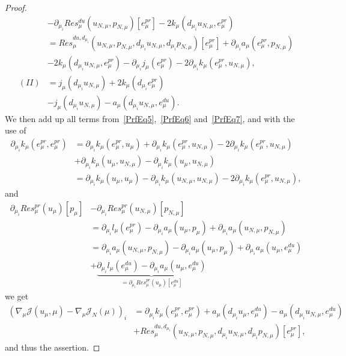 \begin{proof}
\begin{align}
        &- \partial_{\mu_i} Res_\mu^{du}(u_{N, \mu}, p_{N, \mu})[e_\mu^{pr}] - 2 k_\mu(d_{\mu_i} u_{N, \mu}, e_\mu^{pr}) \nonumber\\
        &= Res_\mu^{du, d_{\mu_i}}(u_{N, \mu}, p_{N, \mu}, d_{\mu_i} u_{N, \mu}, d_{\mu_i} p_{N, \mu})[e_\mu^{pr}] + \partial_{\mu_i} a_\mu(e_\mu^{pr}, p_{N, \mu}) \nonumber\\
        &- 2 k_\mu(d_{\mu_i} u_{N, \mu}, e_\mu^{pr}) - \partial_{\mu_i} j_\mu(e_\mu^{pr}) - 2 \partial_{\mu_i} k_\mu(e_\mu^{pr}, u_{N, \mu}), \nonumber\\
        (II) &= j_\mu(d_{\mu_i} u_{N, \mu}) + 2 k_\mu(d_{\mu_i} e_\mu^{pr}) \label{PrfEq7}\\
        &- j_\mu(d_{\mu_i} u_{N, \mu}) - a_\mu(d_{\mu_i} u_{N, \mu}, e_\mu^{du}). \nonumber
    \end{align}
    We then add up all terms from~\eqref{PrfEq5},~\eqref{PrfEq6} and~\eqref{PrfEq7}, and with the use of
    \begin{align*}
        \partial_{\mu_i} k_\mu(e_\mu^{pr}, e_\mu^{pr}) &= \partial_{\mu_i} k_\mu(e_\mu^{pr}, u_\mu) + \partial_{\mu_i} k_\mu(e_\mu^{pr}, u_{N, \mu}) - 2 \partial_{\mu_i} k_\mu(e_\mu^{pr}, u_{N, \mu}) \\
        &+ \partial_{\mu_i} k_\mu(u_\mu, u_{N, \mu}) - \partial_{\mu_i} k_\mu(u_\mu, u_{N, \mu}) \\
        &= \partial_{\mu_i} k_\mu(u_\mu, u_\mu) - \partial_{\mu_i} k_\mu(u_{N, \mu}, u_{N, \mu}) - 2 \partial_{\mu_i} k_\mu(e_\mu^{pr}, u_{N, \mu}),
    \end{align*}
    and
    \begin{align*}
        \partial_{\mu_i} Res_\mu^{pr}(u_\mu)[p_\mu] &- \partial_{\mu_i} Res_\mu^{pr}(u_{N, \mu})[p_{N, \mu}] \\
        &= \partial_{\mu_i} l_\mu(e_\mu^{pr}) - \partial_{\mu_i} a_\mu(u_\mu, p_\mu) + \partial_{\mu_i} a_\mu(u_{N, \mu}, p_{N, \mu}) \\
        &= \partial_{\mu_i} a_\mu(u_{N, \mu}, p_{N, \mu}) - \partial_{\mu_i} a_\mu(u_\mu, p_\mu) + \partial_{\mu_i} a_\mu(u_\mu, e_\mu^{du}) \\
        &+ \underbrace{\partial_{\mu_i} l_\mu(e_\mu^{du}) - \partial_{\mu_i} a_\mu(u_\mu, e_\mu^{du})}_{= \partial_{\mu_i} Res_\mu^{pr}(u_\mu)[e_\mu^{du}]}
    \end{align*}
    we get
    \begin{align*}
        {\left( \nabla_\mu \mathcal{J}(u_\mu, \mu) - \nabla_\mu \mathcal{J}_N(\mu) \right)}_i &= \partial_{\mu_i} k_\mu(e_\mu^{pr}, e_\mu^{pr}) + a_\mu(d_{\mu_i} u_\mu, e_\mu^{du}) - a_\mu(d_{\mu_i} u_{N, \mu}, e_\mu^{du}) \\
        &+ Res_\mu^{du, d_{\mu_i}}(u_{N, \mu}, p_{N, \mu}, d_{\mu_i} u_{N, \mu}, d_{\mu_i} p_{N, \mu})[e_\mu^{pr}],
    \end{align*}
    and thus the assertion.
\end{proof}